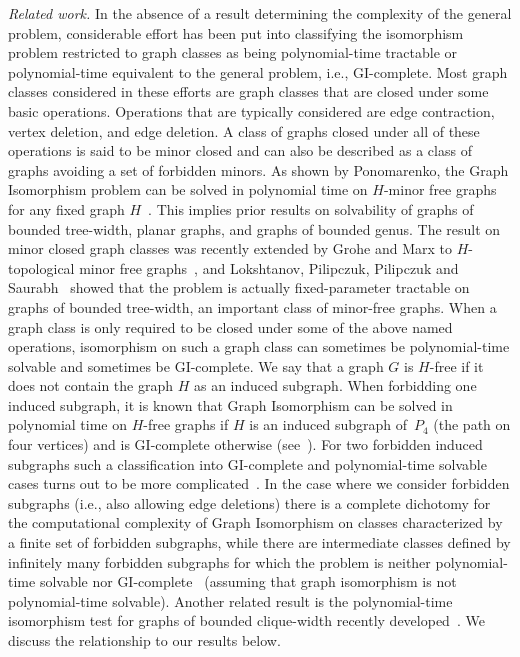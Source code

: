 \documentclass[envcountsame,envcountsect,11pt,a4paper]{llncs}
\begin{document}
{\it Related work.} In the absence of a result determining the complexity of the general problem, considerable effort has been put into
classifying the isomorphism problem restricted to graph classes as being polynomial-time tractable or polynomial-time equivalent to the
general problem, i.e., GI-complete. Most graph classes considered in these efforts are graph classes that are closed under some basic
operations. Operations that are typically considered are edge contraction, vertex deletion, and edge deletion. A class of graphs closed under
all of these operations is said to be minor closed and can also be described as a class of graphs avoiding a set of forbidden minors. As
shown by Ponomarenko, the {\sc Graph Isomorphism} problem can be solved in polynomial time on $H$-minor free graphs for any fixed graph
$H$~\cite{Ponomarenko88}. This implies prior results on solvability of graphs of bounded tree-width, planar graphs, and graphs of
bounded genus. The result on minor closed graph classes was recently extended by Grohe and Marx to $H$-topological minor free
graphs~\cite{GroheM15}, and Lokshtanov, Pilipczuk, Pilipczuk and Saurabh~\cite{LPPS14} showed that the problem is actually fixed-parameter
tractable on graphs of bounded tree-width, an important class of minor-free graphs. When a graph class is only required to be closed under
some of the above named operations, isomorphism on such a graph class can sometimes be polynomial-time solvable and sometimes be
GI-complete. We say that a graph $G$ is $H$-free if it does not contain the graph $H$ as an induced subgraph. When forbidding one induced
subgraph, it is known that {\sc Graph Isomorphism} can be solved in polynomial time on $H$-free graphs if $H$ is an induced subgraph
of~$P_4$ (the path on four vertices) and is GI-complete otherwise (see~\cite{BoothColbourn1979}).
For two forbidden induced subgraphs such a classification into GI-complete and polynomial-time solvable cases turns out to be
more complicated~\cite{DBLP:conf/wg/KratschS12,stacsSchweitzer}. In the case where we consider forbidden subgraphs (i.e., also allowing edge
deletions) there is a complete dichotomy for the computational complexity of {\sc Graph Isomorphism} on classes characterized by
a finite set of forbidden subgraphs, while there are intermediate classes defined by infinitely many forbidden subgraphs
for which the problem is neither polynomial-time solvable nor GI-complete~\cite{OtachiS13}
(assuming that graph isomorphism is not polynomial-time solvable).
Another related result is the polynomial-time isomorphism test for graphs of bounded clique-width recently developed~\cite{rankwidth}. We discuss the relationship to our results below.
\end{document}
